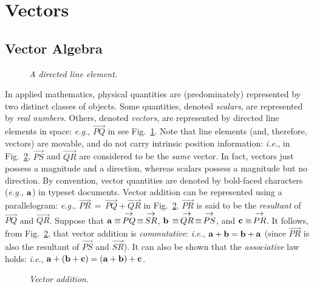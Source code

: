 \section{Vectors}\label{vector}

\subsection{Vector Algebra}
\begin{figure}[b]
\epsfysize=1.5in
\centerline{}
\caption{\em A directed line element.}\label{fig1}
\end{figure}
In applied mathematics, physical quantities are (predominately) represented by two distinct classes
of objects. Some quantities, denoted {\em scalars}, are represented by {\em real
numbers}. Others, denoted {\em vectors}, are represented by 
 directed line elements in space: {\em e.g.},
$\stackrel{\displaystyle \rightarrow}{PQ}$ in see Fig.~\ref{fig1}.
 Note that line elements
(and, therefore, vectors) are movable, and do not carry intrinsic position information: {\em i.e.}, in Fig.~\ref{fig2}, $\stackrel{\displaystyle \rightarrow}{PS}$ and  $\stackrel{\displaystyle \rightarrow}{QR}$
are considered to be the {\em same}\/ vector.
In fact, vectors just possess a magnitude and a direction, whereas scalars possess
a magnitude but no direction.
By convention, vector quantities are denoted by bold-faced characters ({\em e.g.},
${\bf a}$) in 
typeset documents. 
Vector addition
can be represented using a parallelogram: {\em e.g.}, $\stackrel{\displaystyle \rightarrow}{PR}
\,=\,
\stackrel{\displaystyle \rightarrow}{PQ}+ \stackrel{\displaystyle \rightarrow}{QR}$  in Fig.~\ref{fig2}. $\stackrel{\displaystyle \rightarrow}{PR}$ is said to be the {\em resultant}\/ of $\stackrel{\displaystyle \rightarrow}{PQ}$ and $\stackrel{\displaystyle \rightarrow}{QR}$.
Suppose that ${\bf a}\equiv  \,\stackrel{\displaystyle \rightarrow}{PQ}\,\equiv\,\stackrel{\displaystyle \rightarrow}{SR}$,
${\bf b} \,\equiv \,\stackrel{\displaystyle \rightarrow}{QR}\,\equiv
\,\stackrel{\displaystyle \rightarrow}{PS}$, and ${\bf c} \equiv
 \,\stackrel{\displaystyle \rightarrow}{PR}$. It follows,
from Fig.~\ref{fig2}, that vector addition is
{\em commutative}: {\em i.e.}, ${\bf a} + {\bf b} = {\bf b}+{\bf a}$
(since $\stackrel{\displaystyle \rightarrow}{PR}$ is also the resultant
of $\stackrel{\displaystyle \rightarrow}{PS}$ and $\stackrel{\displaystyle \rightarrow}{SR}$). It can also
be shown that the {\em associative}\/ law  holds: {\em i.e.}, ${\bf a} +
 ({\bf b} + {\bf c}) = ({\bf a} + {\bf b}) + {\bf c}$.
\begin{figure}
\epsfysize=2.5in
\centerline{}
\caption{\em Vector addition.}\label{fig2}
\end{figure}

